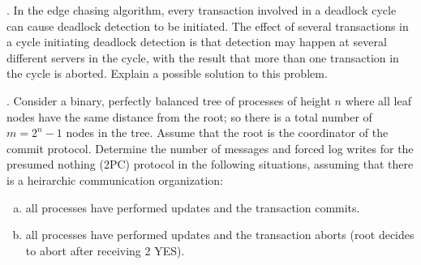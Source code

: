 \documentclass[12pt]{article}
\newcounter{question}
\newcommand{\question}[1]{
    \stepcounter{question}
    \thequestion. #1 \hfill
}
\begin{document}
\question{In the edge chasing algorithm, every transaction involved in a deadlock cycle can cause deadlock detection to be initiated. The effect of several transactions in a cycle initiating deadlock detection is that detection may happen at several different servers in the cycle, with the result that more than one transaction in the cycle is aborted. Explain a possible solution to this problem.}

\question{Consider a binary, perfectly balanced tree of processes of height $n$ where all leaf nodes have the same distance from the root; so there is a total number of $m= 2^n-1$ nodes in the tree. Assume that the root is the coordinator of the commit protocol. Determine the number of messages and forced log writes for the presumed nothing (2PC) protocol in the following situations, assuming that there is a heirarchic communication organization:}


\begin{enumerate}[(a)]
    \item all processes have performed updates and the transaction commits.
    \item all processes have performed updates and the transaction aborts (root decides to abort after receiving 2 YES).
    
\end{enumerate}
\end{document}
